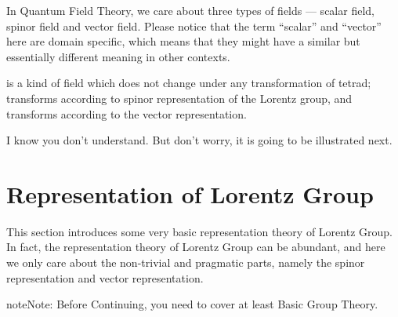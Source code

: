 \documentclass[letterpaper,10pt,english]{sphinxmanual}
\begin{document}
In Quantum Field Theory, we care about three types of fields --- scalar field, spinor field and vector field. Please notice that the term ``scalar'' and ``vector'' here are domain specific, which means that they might have a similar but essentially different meaning in other contexts.

 is a kind of field which does not change under any transformation of tetrad;  transforms according to spinor representation of the Lorentz group, and  transforms according to the vector representation.

I know you don't understand. But don't worry, it is going to be illustrated next.


\section{Representation of Lorentz Group}
\label{\detokenize{repr_lg::doc}}\label{\detokenize{repr_lg:representation-of-lorentz-group}}
This section introduces some very basic representation theory of Lorentz Group. In fact, the representation theory of Lorentz Group can be abundant, and here we only care about the non-trivial and pragmatic parts, namely the spinor representation and vector representation.

\begin{sphinxadmonition}{note}{Note:}
Before Continuing, you need to cover at least Basic Group Theory.
\end{sphinxadmonition}
\end{document}
